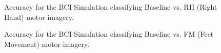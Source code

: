 \documentclass[aspectratio=169]{beamer}
\begin{document}
   
   \begin{frame}   
   \begin{figure}[thpb]
      \centering
      \setlength\fboxsep{0pt}
	  \setlength\fboxrule{0.5pt}
      \caption{\centering Accuracy for the BCI Simulation classifying Baseline vs. RH (Right Hand) motor imagery.}
      \label{figure3}
   \end{figure} 	
	\end{frame}	  
	
	
	\begin{frame}
   \begin{figure}[thpb]
      \centering
      \setlength\fboxsep{0pt}
	  \setlength\fboxrule{0.5pt}
      \caption{\centering Accuracy for the BCI Simulation classifying Baseline vs. FM (Feet Movement) motor imagery.}
      \label{figure3}
   \end{figure} 	
	\end{frame}	  
    
\end{document}
